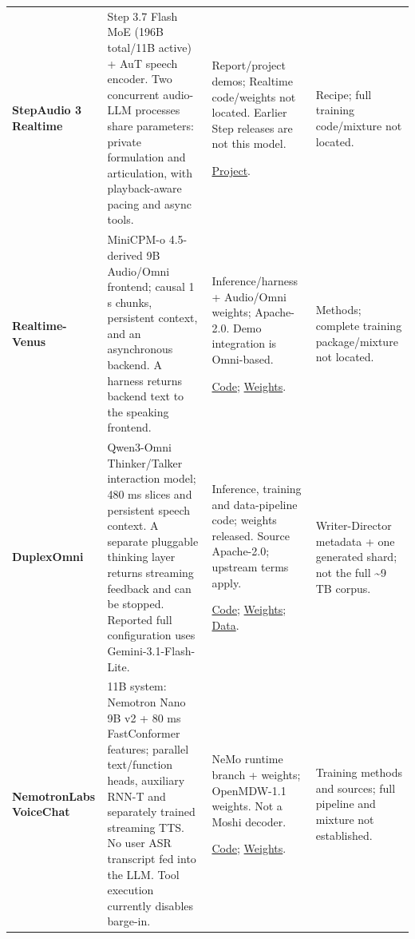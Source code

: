 \begin{longtable}{@{}>{\raggedright\arraybackslash}p{0.22\tablewidth}>{\raggedright\arraybackslash}p{0.43\tablewidth}>{\raggedright\arraybackslash}p{0.20\tablewidth}>{\raggedright\arraybackslash}p{0.15\tablewidth}@{}}
\addlinespace[4pt]
\textbf{StepAudio 3 Realtime}\par\citep{step3} & Step 3.7 Flash MoE (196B total/11B active) + AuT speech encoder. Two concurrent audio-LLM processes share parameters: private formulation and articulation, with playback-aware pacing and async tools. & Report/project demos; Realtime code/weights not located. Earlier Step releases are not this model.\par \href{https://stepaudiollm.github.io/step-audio-3-realtime/}{Project}. & Recipe; full training code/mixture not located. \\
\addlinespace[4pt]
\textbf{Realtime-Venus}\par\citep{venus} & MiniCPM-o 4.5-derived 9B Audio/Omni frontend; causal 1 s chunks, persistent context, and an asynchronous backend. A harness returns backend text to the speaking frontend. & Inference/harness + Audio/Omni weights; Apache-2.0. Demo integration is Omni-based.\par \href{https://github.com/inclusionAI/Realtime-Venus}{Code}; \href{https://huggingface.co/inclusionAI/Realtime-Venus}{Weights}. & Methods; complete training package/mixture not located. \\
\addlinespace[4pt]
\textbf{DuplexOmni}\par\citep{duplexomni} & Qwen3-Omni Thinker/Talker interaction model; 480 ms slices and persistent speech context. A separate pluggable thinking layer returns streaming feedback and can be stopped. Reported full configuration uses Gemini-3.1-Flash-Lite. & Inference, training and data-pipeline code; weights released. Source Apache-2.0; upstream terms apply.\par \href{https://github.com/MuyeHuang/DuplexOmni}{Code}; \href{https://huggingface.co/MuyeHuang/DuplexOmni}{Weights}; \href{https://huggingface.co/datasets/MuyeHuang/DuplexOmni-Data}{Data}. & Writer-Director metadata + one generated shard; not the full \textasciitilde{}9 TB corpus. \\
\addlinespace[4pt]
\textbf{NemotronLabs VoiceChat}\par\citep{voicechat} & 11B system: Nemotron Nano 9B v2 + 80 ms FastConformer features; parallel text/function heads, auxiliary RNN-T and separately trained streaming TTS. No user ASR transcript fed into the LLM. Tool execution currently disables barge-in. & NeMo runtime branch + weights; OpenMDW-1.1 weights. Not a Moshi decoder.\par \href{https://github.com/NVIDIA-NeMo/Speech/tree/nemotron-labs-voicechat}{Code}; \href{https://huggingface.co/nvidia/NVIDIA-NemotronLabs-VoiceChat-11B}{Weights}. & Training methods and sources; full pipeline and mixture not established. \\

\end{longtable}
